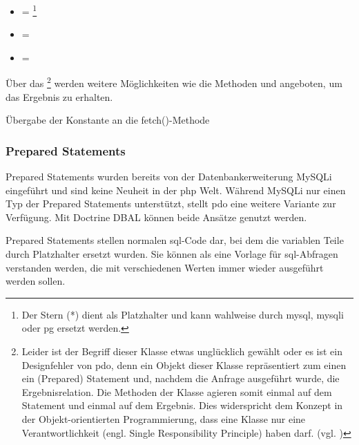 \begin{itemize}
	\item {} = \footnote{Der Stern (*) dient als Platzhalter und kann wahlweise durch mysql, mysqli oder pg ersetzt werden.}
	\item {} = 
	\item {} = 
\end{itemize}

Über das \footnote{Leider ist der Begriff dieser Klasse etwas unglücklich gewählt oder es ist ein Designfehler von \gls{pdo}, denn ein Objekt dieser Klasse repräsentiert zum einen ein (Prepared) Statement und, nachdem die Anfrage ausgeführt wurde, die Ergebnisrelation. Die Methoden der Klasse agieren somit einmal auf dem Statement und einmal auf dem Ergebnis. Dies widerspricht dem Konzept in der Objekt-orientierten Programmierung, dass eine Klasse nur eine Verantwortlichkeit (engl. Single Responsibility Principle) haben darf. (vgl. \cite[S. 181]{book:martinCleanCode2008})} werden weitere Möglichkeiten wie die Methoden  und  angeboten, um das Ergebnis zu erhalten.

\begin{listing}[H]
\caption{Übergabe der Konstante an die fetch()-Methode}
\label{lst:fetctWithWhileLoop}
\end{listing}

\subsubsection{Prepared Statements}
\label{basics:doctrine:subsubsec:preparedStatements}
Prepared Statements wurden bereits von der Datenbankerweiterung MySQLi eingeführt und sind keine Neuheit in der \gls{php} Welt. Während MySQLi nur einen Typ der Prepared Statements unterstützt, stellt \gls{pdo} eine weitere Variante zur Verfügung. Mit Doctrine DBAL können beide Ansätze genutzt werden.

Prepared Statements stellen normalen \gls{sql}-Code dar, bei dem die variablen Teile durch Platzhalter ersetzt wurden. Sie können als eine Vorlage für \gls{sql}-Abfragen verstanden werden, die mit verschiedenen Werten immer wieder ausgeführt werden sollen.


